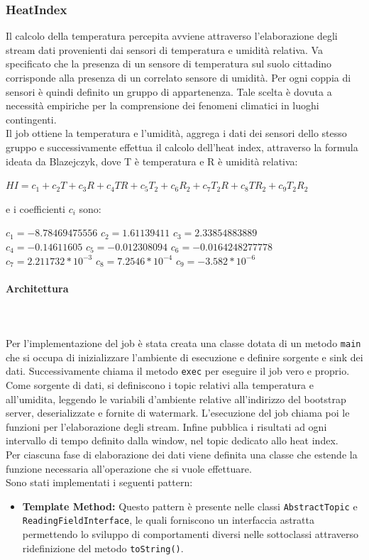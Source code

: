 \documentclass[8pt]{article}
\newcommand{\subsubsubsection}[1]{\paragraph{#1}\mbox{}\\\\}
\begin{document}
\subsubsection{HeatIndex}
Il calcolo della temperatura percepita avviene attraverso l'elaborazione degli stream dati provenienti dai sensori di temperatura e umidità relativa. Va specificato che la presenza di un sensore di temperatura sul suolo cittadino corrisponde alla presenza di un correlato sensore di umidità. Per ogni coppia di sensori è quindi definito un gruppo di appartenenza. Tale scelta è dovuta a necessità empiriche per la comprensione dei fenomeni climatici in luoghi contingenti.
\\Il job ottiene la temperatura e l’umidità, aggrega i dati dei sensori dello stesso gruppo e successivamente effettua il calcolo dell'heat index, attraverso la
formula ideata da Blazejczyk, dove T è temperatura e R è umidità relativa:
\begin{center}
    $HI = c_1 + c_2T + c_3R + c_4T R + c_5T_2 + c_6R_2 + c_7T_2R + c_8TR_2 + c_9T_2R_2$
\end{center}
e i coefficienti $c_i$ sono:
\begin{center}
    $c_1 = -8.78469475556$ $c_2 = 1.61139411$ $c_3 = 2.33854883889$
    \\$c_4 = -0.14611605$ $c_5 = -0.012308094$ $c_6 = -0.0164248277778$
    \\$c_7 = 2.211732 * 10^{-3}$ $c_8 = 7.2546 * 10^{-4}$ $c_9 = -3.582 * 10^{-6}$
\end{center}
\clearpage
\subsubsubsection{Architettura}
Per l'implementazione del job è stata creata una classe dotata di un metodo \verb|main| che si occupa di inizializzare l’ambiente di esecuzione e definire sorgente e sink dei dati. Successivamente chiama il metodo \verb|exec| per eseguire il job vero e proprio. Come sorgente di dati, si definiscono i topic relativi
alla temperatura e all’umidita, leggendo le variabili d’ambiente relative all’indirizzo del bootstrap server, deserializzate e fornite di watermark. L'esecuzione del job chiama poi le funzioni per l'elaborazione degli stream. Infine pubblica i risultati ad ogni intervallo di tempo definito dalla window, nel topic dedicato allo heat index.
\\Per ciascuna fase di elaborazione dei dati viene definita una classe che estende la funzione necessaria all'operazione che si vuole effettuare.
\\Sono stati implementati i seguenti pattern:
\begin{itemize}
    \item \textbf{Template Method:}
    Questo pattern è presente nelle classi \verb|AbstractTopic| e \verb|ReadingFieldInterface|, le quali forniscono un interfaccia astratta permettendo lo sviluppo di comportamenti diversi nelle sottoclassi attraverso ridefinizione del metodo \verb|toString()|.
\end{itemize}
\end{document}
